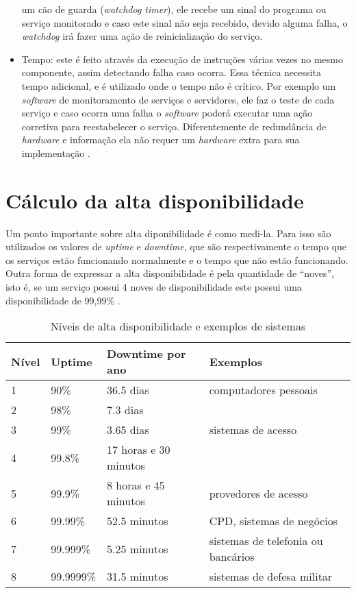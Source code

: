 \begin{itemize}
 um cão de guarda (\textit{watchdog timer}), ele recebe um sinal do programa ou serviço monitorado e caso este sinal não seja recebido, 
 devido alguma falha, o \textit{watchdog} irá fazer uma ação de reinicialização do serviço.
 \item Tempo: este é feito através da execução de instruções várias vezes no mesmo componente, assim detectando falha caso ocorra.
 Essa técnica necessita tempo adicional, e é utilizado onde o tempo não é crítico. Por exemplo um \textit{software} de monitoramento de serviços e
 servidores, ele faz o teste de cada serviço e caso ocorra uma falha o \textit{software} poderá executar uma ação corretiva para reestabelecer o
 serviço. Diferentemente de redundância de \textit{hardware} e informação ela não requer um \textit{hardware} extra para sua implementação 
 \cite{costa2009}.
\end{itemize}

\section{Cálculo da alta disponibilidade}

Um ponto importante sobre alta diponibilidade é como medi-la. Para isso são utilizados os valores de \textit{uptime} e 
\textit{downtime}, que são respectivamente o tempo que os serviços estão funcionando normalmente e o tempo que não estão funcionando.
Outra forma de expressar a alta disponibilidade é pela quantidade de ``noves'', isto é, se um serviço possui 4 noves de disponibilidade
este possui uma disponibilidade de 99,99\% \cite{pereirafilho2004}.

\begin{table}
\caption {Níveis de alta disponibilidade e exemplos de sistemas}
\label{tab:dispniveis}
\begin{center}
\begin{tabular}{|l|l|l|l|}\hline
Nível & Uptime & Downtime por ano & Exemplos\\\hline
1 & 90\% & 36.5 dias & computadores pessoais\\\hline
2 & 98\% & 7.3 dias & \\\hline
3 & 99\% & 3.65 dias & sistemas de acesso\\\hline
4 & 99.8\% & 17 horas e 30 minutos & \\\hline
5 & 99.9\% & 8 horas e 45 minutos & provedores de acesso\\\hline
6 & 99.99\% & 52.5 minutos & CPD, sistemas de negócios\\\hline
7 & 99.999\% & 5.25 minutos & sistemas de telefonia ou bancários\\\hline
8 & 99.9999\% & 31.5 minutos & sistemas de defesa militar\\\hline
\end{tabular}
\end{center}
\end{table}

